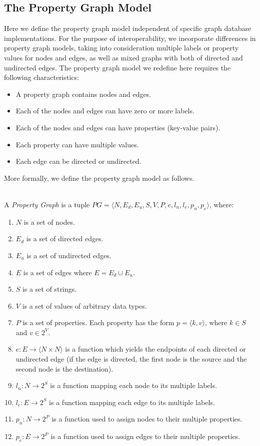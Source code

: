 \documentclass[runningheads]{llncs}
\begin{document}
\subsection{The Property Graph Model}
Here we define the property graph model independent of specific graph database implementations. For the purpose of interoperability, we incorporate differences in property graph models, taking into consideration multiple labels or property values for nodes and edges, as well as mixed graphs with both of directed and undirected edges. The property graph model we redefine here requires the following characteristics:

\begin{itemize}
    \item A property graph contains nodes and edges.
    \item Each of the nodes and edges can have zero or more labels.
    \item Each of the nodes and edges can have properties (key-value pairs).
    \item Each property can have multiple values.
    \item Each edge can be directed or undirected.
\end{itemize}
More formally, we define the property graph model as follows.

\begin{defi}
\leavevmode \vspace{1mm} \\
A \emph{Property Graph} is a tuple
$PG = \langle N, E_d, E_u, S, V, P, e, l_n, l_e, p_n, p_e\rangle$, where:
\begin{enumerate}
    \item $N$ is a set of nodes.
    \item $E_d$ is a set of directed edges.
    \item $E_u$ is a set of undirected edges.
    \item $E$ is a set of edges where $E = E_d \cup E_u$.
    \item $S$ is a set of strings.
    \item $V$ is a set of values of arbitrary data types.
    \item $P$ is a set of properties. Each property has the form $p = \langle k,v \rangle$, where $k \in S$ and $v \in 2^V$.
    \item $e: E \to \langle N \times N \rangle$ is a function which yields the endpoints of each directed or undirected edge (if the edge is directed, the first node is the source and the second node is the destination).
    \item $l_n : N \to 2^S$ is a function mapping each node to its multiple labels.
    \item $l_e : E \to 2^S$ is a function mapping each edge to its multiple labels.
    \item $p_n : N \to 2^P$ is a function used to assign nodes to their multiple properties.
    \item $p_e : E \to 2^P$ is a function used to assign edges to their multiple properties.
\end{enumerate}
\end{defi}
\end{document}
